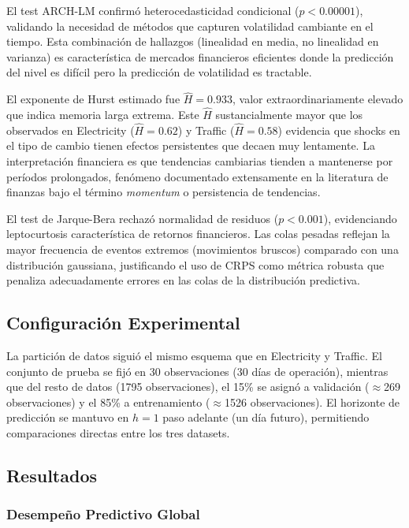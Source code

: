 El test ARCH-LM confirmó heterocedasticidad condicional ($p < 0.00001$), validando la necesidad de métodos que capturen volatilidad cambiante en el tiempo. Esta combinación de hallazgos (linealidad en media, no linealidad en varianza) es característica de mercados financieros eficientes donde la predicción del nivel es difícil pero la predicción de volatilidad es tractable.

El exponente de Hurst estimado fue $\hat{H} = 0.933$, valor extraordinariamente elevado que indica memoria larga extrema. Este $\hat{H}$ sustancialmente mayor que los observados en Electricity ($\hat{H} = 0.62$) y Traffic ($\hat{H} = 0.58$) evidencia que shocks en el tipo de cambio tienen efectos persistentes que decaen muy lentamente. La interpretación financiera es que tendencias cambiarias tienden a mantenerse por períodos prolongados, fenómeno documentado extensamente en la literatura de finanzas bajo el término \textit{momentum} o persistencia de tendencias.

El test de Jarque-Bera rechazó normalidad de residuos ($p < 0.001$), evidenciando leptocurtosis característica de retornos financieros. Las colas pesadas reflejan la mayor frecuencia de eventos extremos (movimientos bruscos) comparado con una distribución gaussiana, justificando el uso de CRPS como métrica robusta que penaliza adecuadamente errores en las colas de la distribución predictiva.

\subsection{Configuración Experimental}
\label{subsec:exchange_configuracion}

La partición de datos siguió el mismo esquema que en Electricity y Traffic. El conjunto de prueba se fijó en 30 observaciones (30 días de operación), mientras que del resto de datos (1795 observaciones), el 15\% se asignó a validación ($\approx$269 observaciones) y el 85\% a entrenamiento ($\approx$1526 observaciones). El horizonte de predicción se mantuvo en $h = 1$ paso adelante (un día futuro), permitiendo comparaciones directas entre los tres datasets.

\subsection{Resultados}
\label{subsec:exchange_resultados}

\subsubsection{Desempeño Predictivo Global}

